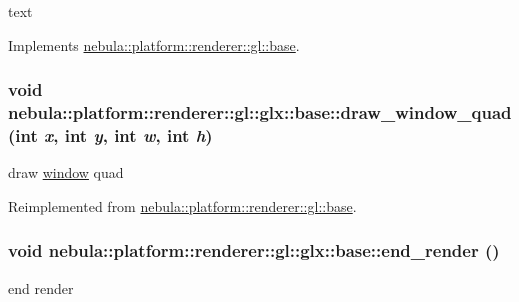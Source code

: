text 

Implements \hyperlink{classnebula_1_1platform_1_1renderer_1_1gl_1_1base_af810a42a4c3731488253ee268352f456}{nebula::platform::renderer::gl::base}.\hypertarget{classnebula_1_1platform_1_1renderer_1_1gl_1_1glx_1_1base_a969f44b3066064468c15596562c18e00}{
\subsubsection[{draw\_\-window\_\-quad}]{\setlength{\rightskip}{0pt plus 5cm}void nebula::platform::renderer::gl::glx::base::draw\_\-window\_\-quad (int {\em x}, \/  int {\em y}, \/  int {\em w}, \/  int {\em h})}}
\label{classnebula_1_1platform_1_1renderer_1_1gl_1_1glx_1_1base_a969f44b3066064468c15596562c18e00}


draw \hyperlink{namespacenebula_1_1platform_1_1window}{window} quad 

Reimplemented from \hyperlink{classnebula_1_1platform_1_1renderer_1_1gl_1_1base_abd5831cdc84edc5bece8a23296acba2b}{nebula::platform::renderer::gl::base}.\hypertarget{classnebula_1_1platform_1_1renderer_1_1gl_1_1glx_1_1base_aaf176ccae80229814c17536d2c9aa24e}{
\subsubsection[{end\_\-render}]{\setlength{\rightskip}{0pt plus 5cm}void nebula::platform::renderer::gl::glx::base::end\_\-render ()}}
\label{classnebula_1_1platform_1_1renderer_1_1gl_1_1glx_1_1base_aaf176ccae80229814c17536d2c9aa24e}


end render 

